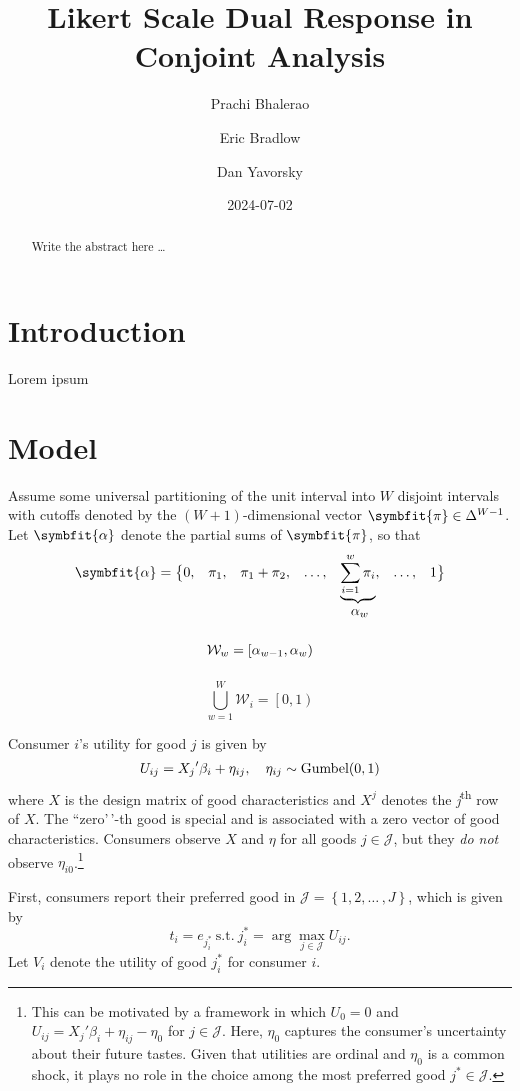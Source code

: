 \documentclass[
]{article}
\title{Likert Scale Dual Response in Conjoint Analysis}
\author{Prachi Bhalerao \and Eric Bradlow \and Dan Yavorsky}
\date{2024-07-02}
\begin{document}
\maketitle
\begin{abstract}
Write the abstract here \ldots{}
\end{abstract}


\section{Introduction}\label{sec-intro}

Lorem ipsum

\section{Model}\label{sec-model}

Assume some universal partitioning of the unit interval into \(W\)
disjoint intervals with cutoffs denoted by the
\(\left(W+1\right)\)-dimensional vector
\(\symbfit{\pi} \in \Delta^{W-1}\). Let \(\symbfit{\alpha}\) denote the
partial sums of \(\symbfit{\pi}\), so that \[
    \begin{array}{*9{c}}
       \symbfit{\alpha}  = \big\lbrace 0, & \pi_1, & \pi_1 + \pi_2, & \ldots, & \underbrace{\sum_{i=1}^{w} \pi_{i}}, & \ldots, & 1\big\rbrace \\
         & & & & \alpha_w 
    \end{array}
\] \[
    \vphantom{\bigcup_{w=1}^W} \mathcal{W}_w = \left[\alpha_{w-1}, \alpha_w\right)
\] \[
    \bigcup_{w=1}^W \mathcal{W}_i = \left[0, 1\right)
\]

Consumer \(i\)'s utility for good \(j\) is given by \[
    U_{ij} = {X_j}'\beta_i + \eta_{ij},\quad \eta_{ij} \sim \text{Gumbel}\mleft(0,1\mright)
\] where \(X\) is the design matrix of good characteristics and \(X^j\)
denotes the \textit{j}\textsuperscript{th} row of \(X\). The
``zero'\,'-th good is special and is associated with a zero vector of
good characteristics. Consumers observe \(X\) and \(\eta\) for all goods
\(j \in \mathcal{J}\), but they \emph{do not} observe
\(\eta_{i0}\).\footnote{This can be motivated by a framework in which $U_0 = 0$ and $U_{ij} = {X_j}'\beta_i + \eta_{ij} - \eta_0$ for $j \in \mathcal{J}$. Here, $\eta_0$ captures the consumer's uncertainty about their future tastes. Given that utilities are ordinal and $\eta_0$ is a common shock, it plays no role in the choice among the most preferred good $j^* \in \mathcal{J}$.}

First, consumers report their preferred good in
\(\mathcal{J} = \left\lbrace 1, 2, \ldots\,, J\right\rbrace\), which is
given by \[
    t_i = e_{j^*_i}\ \text{s.t.}\ j^*_i = \arg\max_{j\in\mathcal{J}} U_{ij}.
\] Let \(V_i\) denote the utility of good \(j^*_i\) for consumer \(i\).
\end{document}
